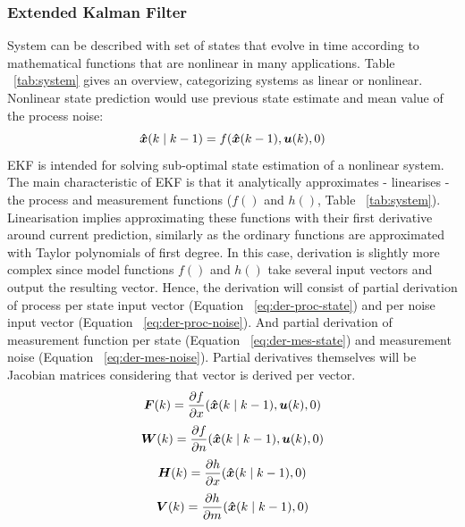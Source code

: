 \subsubsection{Extended Kalman Filter} \label{sec:ekf}
System can be described with set of states that evolve in time according to mathematical functions that are nonlinear in many applications. Table ~\ref{tab:system} gives an overview, categorizing systems as linear or nonlinear. Nonlinear state prediction would use previous state estimate and mean value of the process noise:
\begin{equation}
\boldsymbol{\hat{x}}(k \mid k-1) = f(\boldsymbol{\hat{x}}(k-1), \boldsymbol{u}(k), 0)
\label{eq:state-pred-nonlin}
\end{equation} 
EKF is intended for solving sub-optimal state estimation of a nonlinear system. The main characteristic of EKF is that it analytically approximates - linearises - the process and measurement functions ($f()$ and $h()$, Table ~\ref{tab:system}). Linearisation implies approximating these functions with their first derivative around current prediction, similarly as the ordinary functions are approximated with Taylor polynomials of first degree. In this case, derivation is slightly more complex since model functions $f()$ and $h()$ take several input vectors and output the resulting vector. Hence, the derivation will consist of partial derivation of process per state input vector (Equation ~\ref{eq:der-proc-state}) and per noise input vector (Equation ~\ref{eq:der-proc-noise}). And partial derivation of measurement function per state (Equation ~\ref{eq:der-mes-state}) and measurement noise (Equation ~\ref{eq:der-mes-noise}). Partial derivatives themselves will be Jacobian matrices considering that vector is derived per vector. 
\begin{equation}
\boldsymbol{F}(k) = \frac{\partial f}{\partial x} (\boldsymbol{\hat{x}}(k \mid k-1), \boldsymbol{u}(k), 0)
\label{eq:der-proc-state}
\end{equation} 
\begin{equation}
\boldsymbol{W}(k) = \frac{\partial f}{\partial n} (\boldsymbol{\hat{x}}(k \mid k-1), \boldsymbol{u}(k), 0)
\label{eq:der-proc-noise}
\end{equation}
\begin{equation}
\boldsymbol{H}(k) = \frac{\partial h}{\partial x} (\boldsymbol{\hat{x}}(k \mid k-1), 0)
\label{eq:der-mes-state}
\end{equation} 
\begin{equation}
\boldsymbol{V}(k) = \frac{\partial h}{\partial m} (\boldsymbol{\hat{x}}(k \mid k-1), 0)
\label{eq:der-mes-noise}
\end{equation}
